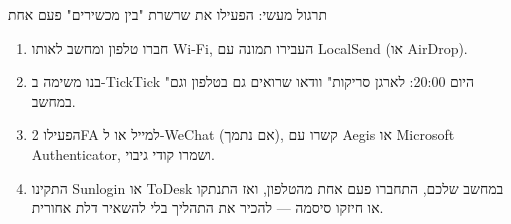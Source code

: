 \begin{tcbpractice}{תרגול מעשי: הפעילו את שרשרת "בין מכשירים" פעם אחת}
\begin{enumerate}
  \item חברו טלפון ומחשב לאותו Wi-Fi, העבירו תמונה עם LocalSend (או AirDrop).
  \item בנו משימה ב-TickTick "היום 20:00: לארגן סריקות" וודאו שרואים גם בטלפון וגם במחשב.
  \item הפעילו 2FA למייל או ל-WeChat (אם נתמך), קשרו עם Aegis או Microsoft Authenticator, ושמרו קודי גיבוי.
  \item התקינו Sunlogin או ToDesk במחשב שלכם, התחברו פעם אחת מהטלפון, ואז התנתקו או חיזקו סיסמה — להכיר את התהליך בלי להשאיר דלת אחורית.
\end{enumerate}

\end{tcbpractice}
